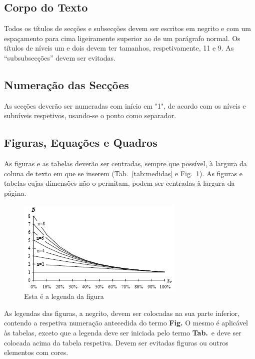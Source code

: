 \documentclass[twocolumn]{article}
\begin{document}
\subsection{Corpo do Texto}

Todos os títulos de secções e subsecções devem ser escritos em negrito e com um espaçamento para cima ligeiramente superior ao de um parágrafo normal. 
Os títulos de níveis um e dois devem ter tamanhos, respetivamente, 11 e 9. 
As ``subsubsecções'' devem ser evitadas.

\subsection{Numeração das Secções}

As secções deverão ser numeradas com início em "1", de acordo com os níveis e subníveis respetivos, usando-se o ponto como separador.

\subsection{Figuras, Equações e Quadros}

As figuras e as tabelas deverão ser centradas, sempre que possível, à largura da coluna de texto em que se
inserem (Tab.~\ref{tab:medidas} e Fig.~\ref{fig:figura}). 
As figuras e tabelas cujas dimensões não o permitam, podem ser centradas à largura da página.

\begin{figure}[H]
\centerline{\includegraphics[scale=.6]{figura.png}}
\caption{Esta é a legenda da figura}  
\label{fig:figura}
\end{figure}

As legendas das figuras, a negrito, devem ser colocadas na sua parte inferior, contendo a respetiva numeração antecedida do termo \textbf{Fig.} 
O mesmo é aplicável às tabelas, exceto que a legenda deve ser iniciada pelo termo \textbf{Tab.}\ e deve ser colocada acima da tabela respetiva. 
Devem ser evitadas figuras ou outros elementos com cores.
\end{document}
